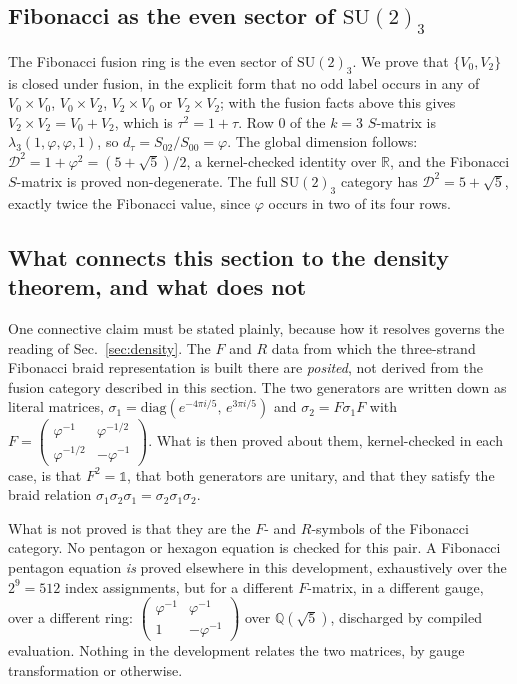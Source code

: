 \documentclass[aps,prx,nofootinbib,superscriptaddress,12pt]{revtex4-2}
\begin{document}
\subsection{Fibonacci as the even sector of $\mathrm{SU}(2)_3$}
\label{subsec:fibeven}

The Fibonacci fusion ring is the even sector of $\mathrm{SU}(2)_3$. We
prove that $\{V_0, V_2\}$ is closed under fusion, in the explicit form
that no odd label occurs in any of $V_0 \times V_0$, $V_0 \times V_2$,
$V_2 \times V_0$ or $V_2 \times V_2$; with the fusion facts above this
gives $V_2 \times V_2 = V_0 + V_2$, which is $\tau^2 = 1 + \tau$. Row
$0$ of the $k=3$ $S$-matrix is $\lambda_3(1,\varphi,\varphi,1)$, so
$d_\tau = S_{02}/S_{00} = \varphi$. The global dimension follows:
$\mathcal{D}^2 = 1 + \varphi^2 = (5+\sqrt5)/2$, a kernel-checked
identity over $\mathbb{R}$, and the Fibonacci $S$-matrix is proved
non-degenerate. The full $\mathrm{SU}(2)_3$ category has
$\mathcal{D}^2 = 5 + \sqrt5$, exactly twice the Fibonacci value, since
$\varphi$ occurs in two of its four rows.

\subsection{What connects this section to the density theorem, and what does not}
\label{subsec:posited}

One connective claim must be stated plainly, because how it resolves
governs the reading of Sec.~\ref{sec:density}. The $F$ and $R$ data from
which the three-strand Fibonacci braid representation is built there are
\emph{posited}, not derived from the fusion category described in this
section. The two generators are written down as literal matrices,
$\sigma_1 = \mathrm{diag}(e^{-4\pi i/5},\, e^{3\pi i/5})$ and
$\sigma_2 = F\sigma_1 F$ with
$F = \left(\begin{smallmatrix} \varphi^{-1} & \varphi^{-1/2}\\
\varphi^{-1/2} & -\varphi^{-1}\end{smallmatrix}\right)$. What is then
proved about them, kernel-checked in each case, is that
$F^2 = \mathbb{1}$, that both generators are unitary, and that they
satisfy the braid relation
$\sigma_1\sigma_2\sigma_1 = \sigma_2\sigma_1\sigma_2$.

What is not proved is that they are the $F$- and $R$-symbols of the
Fibonacci category. No pentagon or hexagon equation is checked for this
pair. A Fibonacci pentagon equation \emph{is} proved elsewhere in this
development, exhaustively over the $2^9 = 512$ index assignments, but
for a different $F$-matrix, in a different gauge, over a different ring:
$\left(\begin{smallmatrix} \varphi^{-1} & \varphi^{-1}\\
1 & -\varphi^{-1}\end{smallmatrix}\right)$ over $\mathbb{Q}(\sqrt5)$,
discharged by compiled evaluation. Nothing in the development relates
the two matrices, by gauge transformation or otherwise.
\end{document}
